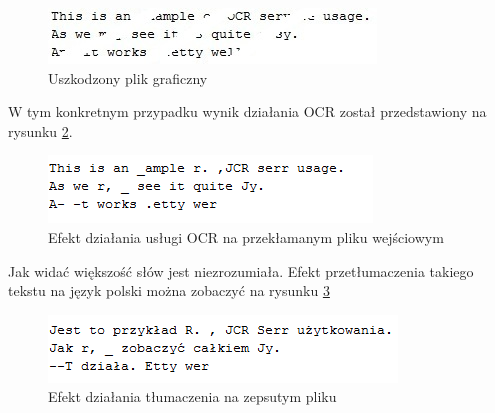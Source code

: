 \begin{figure}[!h]
\centering
\includegraphics[scale=0.9]{brokenOCRExample.jpg}
\caption{Uszkodzony plik graficzny}\label{fig:uszkodzoneWejscie}
\end{figure} 

 W tym konkretnym przypadku wynik działania OCR został przedstawiony na rysunku \ref{fig:zepsuteWyjscieOCR}.

\begin{figure}[!h]
\centering
\includegraphics[scale=0.9]{zepsuteWyjscieOCR.png}
\caption{Efekt działania usługi OCR na przekłamanym pliku wejściowym}\label{fig:zepsuteWyjscieOCR}
\end{figure} 

Jak widać większość słów jest niezrozumiała. Efekt przetłumaczenia takiego tekstu na język polski można zobaczyć na rysunku \ref{fig:zepsuteWyjscieTlumaczenia}
\begin{figure}[!h]
\centering
\includegraphics[scale=0.9]{zepsuteWyjscieTlumaczenia.png}
\caption{Efekt działania tłumaczenia na zepsutym pliku}\label{fig:zepsuteWyjscieTlumaczenia}
\end{figure} 

